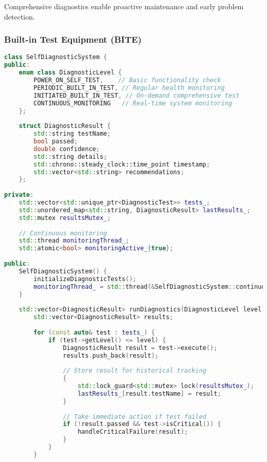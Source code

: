 Comprehensive diagnostics enable proactive maintenance and early problem detection.

\subsubsection{Built-in Test Equipment (BITE)}

\begin{lstlisting}[language=C++, caption=Self-Diagnostic System]
class SelfDiagnosticSystem {
public:
    enum class DiagnosticLevel {
        POWER_ON_SELF_TEST,    // Basic functionality check
        PERIODIC_BUILT_IN_TEST, // Regular health monitoring
        INITIATED_BUILT_IN_TEST, // On-demand comprehensive test
        CONTINUOUS_MONITORING   // Real-time system monitoring
    };
    
    struct DiagnosticResult {
        std::string testName;
        bool passed;
        double confidence;
        std::string details;
        std::chrono::steady_clock::time_point timestamp;
        std::vector<std::string> recommendations;
    };
    
private:
    std::vector<std::unique_ptr<DiagnosticTest>> tests_;
    std::unordered_map<std::string, DiagnosticResult> lastResults_;
    std::mutex resultsMutex_;
    
    // Continuous monitoring
    std::thread monitoringThread_;
    std::atomic<bool> monitoringActive_{true};
    
public:
    SelfDiagnosticSystem() {
        initializeDiagnosticTests();
        monitoringThread_ = std::thread(&SelfDiagnosticSystem::continuousMonitoring, this);
    }
    
    std::vector<DiagnosticResult> runDiagnostics(DiagnosticLevel level) {
        std::vector<DiagnosticResult> results;
        
        for (const auto& test : tests_) {
            if (test->getLevel() <= level) {
                DiagnosticResult result = test->execute();
                results.push_back(result);
                
                // Store result for historical tracking
                {
                    std::lock_guard<std::mutex> lock(resultsMutex_);
                    lastResults_[result.testName] = result;
                }
                
                // Take immediate action if test failed
                if (!result.passed && test->isCritical()) {
                    handleCriticalFailure(result);
                }
            }
        }
        

\end{lstlisting}
